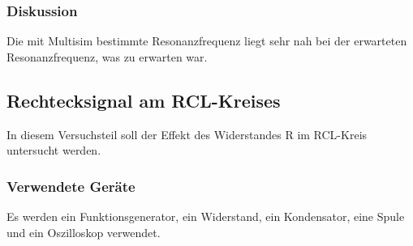 \documentclass[12pt,a4paper]{article}
\begin{document}
\subsubsection{Diskussion}

Die mit Multisim bestimmte Resonanzfrequenz liegt sehr nah bei der erwarteten Resonanzfrequenz, was zu erwarten war.


\subsection{Rechtecksignal am RCL-Kreises}

In diesem Versuchsteil soll der Effekt des Widerstandes R im RCL-Kreis untersucht werden.

\subsubsection{Verwendete Geräte}

Es werden ein Funktionsgenerator, ein Widerstand, ein Kondensator, eine Spule und ein Oszilloskop verwendet.
\end{document}
